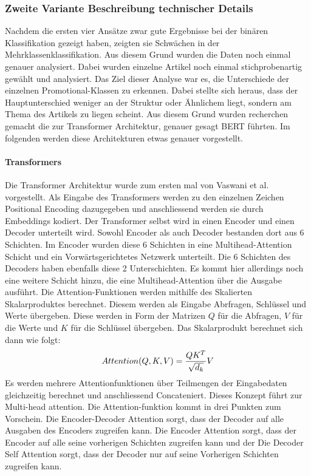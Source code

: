 \subsubsection{Zweite Variante Beschreibung technischer Details}
Nachdem die ersten vier Ansätze zwar gute Ergebnisse bei der binären Klassifikation gezeigt haben, zeigten sie Schwächen in der Mehrklassenklassifikation. Aus diesem Grund wurden die Daten noch einmal genauer analysiert. Dabei wurden einzelne Artikel noch einmal stichprobenartig gewählt und analysiert. Das Ziel dieser Analyse war es, die Unterschiede der einzelnen Promotional-Klassen zu erkennen. Dabei stellte sich heraus, dass der Hauptunterschied weniger an der Struktur oder Ähnlichem liegt, sondern am Thema des Artikels zu liegen scheint. Aus diesem Grund wurden recherchen gemacht die zur Transformer Architektur, genauer gesagt BERT führten. Im folgenden werden diese Architekturen etwas genauer vorgestellt.
\paragraph{Transformers}
Die Transformer Architektur wurde zum ersten mal von Vaswani et al. \cite{Attention} vorgestellt. Als Eingabe des Transformers werden zu den einzelnen Zeichen Positional Encoding dazugegeben und anschliessend werden sie durch Embeddings kodiert. Der Transformer selbst wird in einen Encoder und einen Decoder unterteilt wird. Sowohl Encoder als auch Decoder bestanden dort aus 6 Schichten. Im Encoder wurden diese 6 Schichten in eine Multihead-Attention Schicht und ein Vorwärtsgerichtetes Netzwerk unterteilt. Die 6 Schichten des Decoders haben ebenfalls diese 2 Unterschichten. Es kommt hier allerdings noch eine weitere Schicht hinzu, die eine Multihead-Attention über die Ausgabe ausführt. Die Attention-Funktionen werden mithilfe des Skalierten Skalarproduktes berechnet. Diesem werden als Eingabe Abrfragen, Schlüssel und Werte übergeben. Diese werden in Form der Matrizen $Q$ für die Abfragen, $V$ für die Werte und $K$ für die Schlüssel übergeben. Das Skalarprodukt berechnet sich dann wie folgt:
$${Attention(Q,K,V)} = {{{QK^T} \over \sqrt{d_k}} V}$$
Es werden mehrere Attentionfunktionen über Teilmengen der Eingabedaten gleichzeitig berechnet und anschliessend Concateniert. Dieses Konzept führt zur Multi-head attention. Die Attention-funktion kommt in drei Punkten zum Vorschein. Die Encoder-Decoder Attention sorgt, dass der Decoder auf alle Ausgaben des Encoders zugreifen kann. Die Encoder Attention sorgt, dass der Encoder auf alle seine vorherigen Schichten zugreifen kann und der Die Decoder Self Attention sorgt, dass der Decoder nur auf seine Vorherigen Schichten zugreifen kann. 
